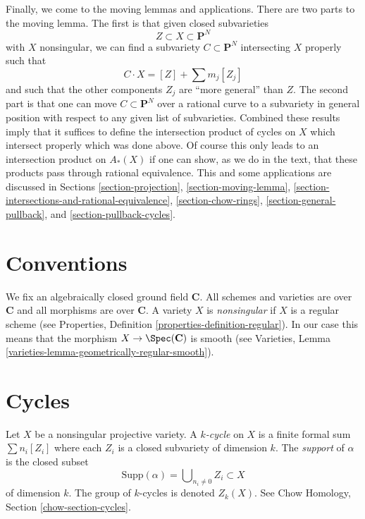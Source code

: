 \medskip\noindent
Finally, we come to the moving lemmas and applications. There are two
parts to the moving lemma. The first is that given closed subvarieties
$$
Z \subset X \subset \mathbf{P}^N
$$
with $X$ nonsingular, we can find a subvariety $C \subset \mathbf{P}^N$
intersecting $X$ properly such that
$$
C \cdot X = [Z] + \sum m_j [Z_j]
$$
and such that the other components $Z_j$ are ``more general'' than $Z$.
The second part is that one can move $C \subset \mathbf{P}^N$ over
a rational curve to a subvariety in general position with respect to
any given list of subvarieties. Combined these results imply that it suffices
to define the intersection product of cycles on $X$ which intersect
properly which was done above. Of course this only leads to an intersection
product on $A_*(X)$ if one can show, as we do in the text, that these products
pass through rational equivalence. This and some applications are discussed 
in Sections
\ref{section-projection},
\ref{section-moving-lemma},
\ref{section-intersections-and-rational-equivalence},
\ref{section-chow-rings},
\ref{section-general-pullback}, and
\ref{section-pullback-cycles}.



\section{Conventions}
\label{section-conventions}

\noindent
We fix an algebraically closed ground field $\mathbf{C}$.
All schemes and varieties are over $\mathbf{C}$ and all
morphisms are over $\mathbf{C}$. A variety $X$ is
{\it nonsingular} if $X$ is a regular scheme (see
Properties, Definition \ref{properties-definition-regular}).
In our case this means that the morphism $X \to \Spec(\mathbf{C})$
is smooth (see
Varieties, Lemma \ref{varieties-lemma-geometrically-regular-smooth}).


\section{Cycles}
\label{section-cycles}

\noindent
Let $X$ be a nonsingular projective variety.
A {\it $k$-cycle} on $X$ is a finite formal sum $\sum n_i [Z_i]$
where each $Z_i$ is a closed subvariety of dimension $k$.
The {\it support} of $\alpha$ is the closed subset
$$
\text{Supp}(\alpha) = \bigcup\nolimits_{n_i \not = 0} Z_i \subset X
$$
of dimension $k$. The group of $k$-cycles is denoted $Z_k(X)$.
See Chow Homology, Section \ref{chow-section-cycles}.



